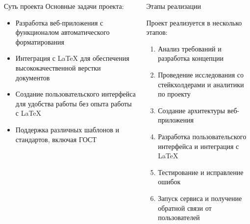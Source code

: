 \documentclass[final]{beamer}
\newlength{\onecolwid}
\newlength{\twocolwid}
\begin{document}
\begin{frame}[t]
\begin{columns}[t]
\begin{column}{\twocolwid}
\begin{columns}[t,totalwidth=\twocolwid]
\begin{column}{\onecolwid}
\begin{block}{Суть проекта}
Основные задачи проекта:
\begin{itemize}
\item Разработка веб-приложения с функционалом автоматического форматирования
\item Интеграция с LaTeX для обеспечения высококачественной верстки документов
\item Создание пользовательского интерфейса для удобства работы без опыта работы с LaTeX
\item Поддержка различных шаблонов и стандартов, включая ГОСТ
\end{itemize}

\end{block}


\end{column} %

\begin{column}{\onecolwid}\vspace{-.6in} %


\begin{block}{Этапы реализации}

Проект реализуется в несколько этапов:

\begin{enumerate}
\item Анализ требований и разработка концепции
\item Проведение исследования со стейкхолдерами и аналитики по проекту
\item Создание архитектуры веб-приложения
\item Разработка пользовательского интерфейса и интеграция с LaTeX
\item Тестирование и исправление ошибок
\item Запуск сервиса и получение обратной связи от пользователей
\end{enumerate}

\end{block}


\end{column} %


\end{columns}
\end{column}
\end{columns}
\end{frame}
\end{document}
